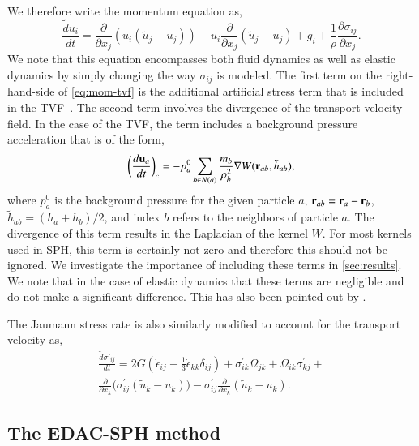 %
We therefore write the momentum equation as,
\begin{equation}
  \label{eq:mom-tvf}
  \frac{\tilde{d} u_i}{d t} =
  \frac{\partial}{\partial x_j} (u_i (\tilde{u}_j - u_j))
  - u_i \frac{\partial}{\partial x_j} (\tilde{u}_j - u_j)
  + g_i
  +\frac{1}{\rho} \frac{\partial \sigma_{ij}}{\partial x_j}.
\end{equation}
We note that this equation encompasses both fluid dynamics as well as elastic
dynamics by simply changing the way $\sigma_{ij}$ is modeled. The first term
on the right-hand-side of \cref{eq:mom-tvf} is the additional artificial
stress term that is included in the TVF~\citep{Adami2013}. The second term
involves the divergence of the transport velocity field. In the case of the
TVF, the term includes a background pressure acceleration that is of the form,
\begin{equation}
  \label{eq:tvf-accel}
  \bigg(\frac{d \mathbf{u}_a}{dt}\bigg)_{c} = - p^0_a \sum_{b \in N(a)}
  \frac{m_b}{\rho_b^2} \nabla W(\mathbf{r}_{ab}, \tilde{h}_{ab}),
\end{equation}
where $p^0_a$ is the background pressure for the given particle $a$,
$\mathbf{r}_{ab} = \mathbf{r}_a - \mathbf{r}_b$, $\tilde{h}_{ab} = (h_a + h_b)/2$, and
index $b$ refers to the neighbors of particle $a$. The divergence of this term
results in the Laplacian of the kernel $W$. For most kernels used in SPH, this
term is certainly not zero and therefore this should not be ignored. We
investigate the importance of including these terms in \cref{sec:results}. We
note that in the case of elastic dynamics that these terms are negligible and
do not make a significant difference. This has also been pointed out by
\cite{zhang_hu_adams17}.

The Jaumann stress rate is also similarly modified to account for the
transport velocity as,
\begin{multline}
  \label{eq:modified-jaumann-stress-rate}
  \frac{\tilde{d} \sigma'_{ij}}{dt} = 2G (\dot{\epsilon}_{ij} - \frac{1}{3}
  \dot{\epsilon}_{kk} \delta_{ij}) + \sigma^{'}_{ik}  \Omega_{jk} +
  \Omega_{ik} \sigma^{'}_{kj} + \\
  \frac{\partial}{\partial x_k}\big(\sigma^{'}_{ij}  (\tilde{u}_k - u_k)\big)
  - \sigma^{'}_{ij} \frac{\partial}{\partial x_k} (\tilde{u}_k - u_k).
\end{multline}


\subsection{The EDAC-SPH method}
\label{sec:edac-tvf}

